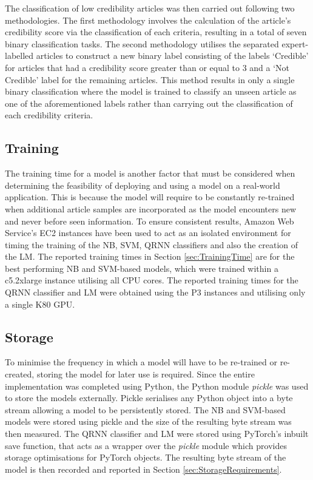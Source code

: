 \documentclass[a4paper,twoside,phd]{BYUPhys}
\begin{document}
The classification of low credibility articles was then carried out following two methodologies. The first methodology involves the calculation of the article's credibility score via the classification of each criteria, resulting in a total of seven binary classification tasks. The second methodology utilises the separated expert-labelled articles to construct a new binary label consisting of the labels `Credible' for articles that had a credibility score greater than or equal to 3 and a `Not Credible' label for the remaining articles. This method results in only a single binary classification where the model is trained to classify an unseen article as one of the aforementioned labels rather than carrying out the classification of each credibility criteria.

\subsection{Training}
\label{sec:TrainingExperiments}
The training time for a model is another factor that must be considered when determining the feasibility of deploying and using a model on a real-world application. This is because the model will require to be constantly re-trained when additional article samples are incorporated as the model encounters new and never before seen information. To ensure consistent results, Amazon Web Service's EC2 instances \cite{AWS} have been used to act as an isolated environment for timing the training of the NB, SVM, QRNN classifiers and also  the creation of the LM. The reported training times in Section \ref{sec:TrainingTime} are for the best performing NB and SVM-based models, which were trained within a c5.2xlarge instance utilising all CPU cores. The reported training times for the QRNN classifier and LM were obtained using the P3 instances and utilising only a single K80 GPU.


\subsection{Storage}
\label{sec:StorageExperiments}
To minimise the frequency in which a model will have to be re-trained or re-created, storing the model for later use is required. Since the entire implementation was completed using Python, the Python module \textit{pickle} was used to store the models externally. Pickle serialises any Python object into a byte stream allowing a model to be persistently stored. The NB and SVM-based models were stored using pickle and the size of the resulting byte stream was then measured. The QRNN classifier and LM were stored using PyTorch's inbuilt save function, that acts as a wrapper over the \textit{pickle} module which provides storage optimisations for PyTorch objects. The resulting byte stream of the model is then recorded and reported in Section \ref{sec:StorageRequirements}.
\end{document}
